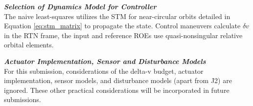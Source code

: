 





\textbf{\textit{Selection of Dynamics Model for Controller}} \\
The naive least-squares utilizes the STM for near-circular orbits detailed in Equation \ref{eq:stm_matrix} to propagate the state. Control maneuvers calculate $\delta v$ in the RTN frame, the input and reference ROEs use quasi-nonsingular relative orbital elements.

\textbf{\textit{Actuator Implementation, Sensor and Disturbance Models}} \\
For this submission, considerations of the delta-v budget, actuator implementation, sensor models, and disturbance models (apart from J2) are ignored. These other practical considerations will be incorporated in future submissions.

